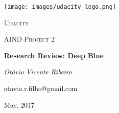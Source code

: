 \documentclass[12pt, a4paper]{article}
\begin{document}
	
\begin{titlepage}
\centering
\texttt{[image: images/udacity\_logo.png]}\par\vspace{1cm}
{\scshape\LARGE Udacity \par}
\vspace{1cm}
{\scshape\Large AIND Project 2\par}
\vspace{1.5cm}
{\huge\bfseries Research Review: Deep Blue\par}
\vspace{2cm}
{\Large\itshape Otávio Vicente Ribeiro\par}
{\large\ttfamily otavio.r.filho@gmail.com\par}

\vfill

{May, 2017\par}
\end{titlepage}
	


\appendix
\nocite{deepblue}


\end{document}

